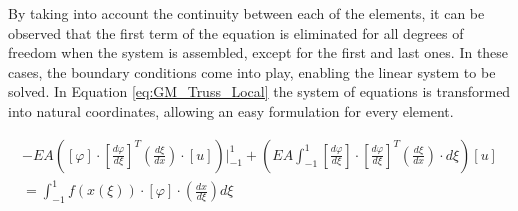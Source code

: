 \documentclass{article}
\begin{document}
By taking into account the continuity between each of the elements, it can be observed that the first term of the equation is eliminated for all degrees of freedom when the system is assembled, except for the first and last ones. In these cases, the boundary conditions come into play, enabling the linear system to be solved. In Equation \ref{eq:GM_Truss_Local} the system of equations is transformed into natural coordinates, allowing an easy formulation for every element.

\vspace{2ex}

\begin{equation}\label{eq:GM_Truss_Local}
\begin{aligned}
    -EA\left([\varphi]\cdot\left[\frac{d\varphi}{d\xi}\right]^T \left(\frac{d\xi}{dx}\right)\cdot [u]\right)\Bigg\rvert_{-1}^{1}+\left(EA\int_{-1}^{1}{ \left[\frac{d\varphi}{d\xi}\right] \cdot \left[\frac{d\varphi}{d\xi}\right]^T\left(\frac{d\xi}{dx}\right)\cdot d\xi}\right) [u]\\
    =\int_{-1}^{1}{f\left(x(\xi)\right) \cdot[\varphi]\cdot \left(\frac{dx}{d\xi}\right) d\xi}
\end{aligned}
\end{equation}

\vspace{2ex}
\end{document}
